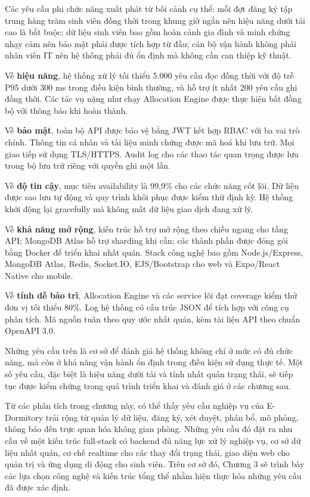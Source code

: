 \documentclass[../DoAn.tex]{subfiles}
\begin{document}
Các yêu cầu phi chức năng xuất phát từ bối cảnh cụ thể: mỗi đợt đăng ký tập trung hàng trăm sinh viên đồng thời trong khung giờ ngắn nên hiệu năng dưới tải cao là bắt buộc; dữ liệu sinh viên bao gồm hoàn cảnh gia đình và minh chứng nhạy cảm nên bảo mật phải được tích hợp từ đầu; cán bộ vận hành không phải nhân viên IT nên hệ thống phải đủ ổn định mà không cần can thiệp kỹ thuật.

Về \textbf{hiệu năng}, hệ thống xử lý tối thiểu 5.000 yêu cầu đọc đồng thời với độ trễ P95 dưới 300 ms trong điều kiện bình thường, và hỗ trợ ít nhất 200 yêu cầu ghi đồng thời. Các tác vụ nặng như chạy Allocation Engine được thực hiện bất đồng bộ với thông báo khi hoàn thành.

Về \textbf{bảo mật}, toàn bộ API được bảo vệ bằng JWT kết hợp RBAC với ba vai trò chính. Thông tin cá nhân và tài liệu minh chứng được mã hoá khi lưu trữ. Mọi giao tiếp sử dụng TLS/HTTPS. Audit log cho các thao tác quan trọng được lưu trong bộ lưu trữ riêng với quyền ghi một lần.

Về \textbf{độ tin cậy}, mục tiêu availability là 99,9\% cho các chức năng cốt lõi. Dữ liệu được sao lưu tự động và quy trình khôi phục được kiểm thử định kỳ. Hệ thống khởi động lại gracefully mà không mất dữ liệu giao dịch đang xử lý.

Về \textbf{khả năng mở rộng}, kiến trúc hỗ trợ mở rộng theo chiều ngang cho tầng API; MongoDB Atlas hỗ trợ sharding khi cần; các thành phần được đóng gói bằng Docker để triển khai nhất quán. Stack công nghệ bao gồm Node.js/Express, MongoDB Atlas, Redis, Socket.IO, EJS/Bootstrap cho web và Expo/React Native cho mobile.

Về \textbf{tính dễ bảo trì}, Allocation Engine và các service lõi đạt coverage kiểm thử đơn vị tối thiểu 80\%. Log hệ thống có cấu trúc JSON để tích hợp với công cụ phân tích. Mã nguồn tuân theo quy ước nhất quán, kèm tài liệu API theo chuẩn OpenAPI 3.0.

Những yêu cầu trên là cơ sở để đánh giá hệ thống không chỉ ở mức có đủ chức năng, mà còn ở khả năng vận hành ổn định trong điều kiện sử dụng thực tế. Một số yêu cầu, đặc biệt là hiệu năng dưới tải và tính nhất quán trạng thái, sẽ tiếp tục được kiểm chứng trong quá trình triển khai và đánh giá ở các chương sau.

Từ các phân tích trong chương này, có thể thấy yêu cầu nghiệp vụ của E-Dormitory trải rộng từ quản lý dữ liệu, đăng ký, xét duyệt, phân bổ, mô phỏng, thông báo đến trực quan hóa không gian phòng. Những yêu cầu đó đặt ra nhu cầu về một kiến trúc full-stack có backend đủ năng lực xử lý nghiệp vụ, cơ sở dữ liệu nhất quán, cơ chế realtime cho các thay đổi trạng thái, giao diện web cho quản trị và ứng dụng di động cho sinh viên. Trên cơ sở đó, Chương 3 sẽ trình bày các lựa chọn công nghệ và kiến trúc tổng thể nhằm hiện thực hóa những yêu cầu đã được xác định.
\end{document}
